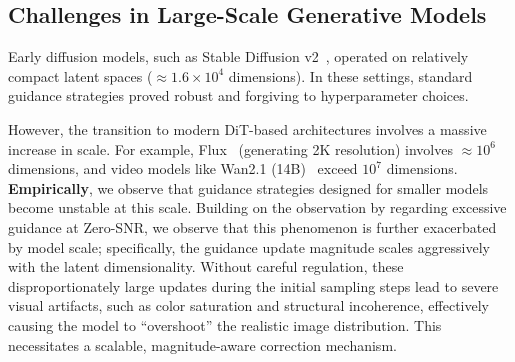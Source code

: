\subsection{Challenges in Large-Scale Generative Models}

Early diffusion models, such as Stable Diffusion v2~\citep{rombach2022high}, operated on relatively compact latent spaces ($\approx 1.6 \times 10^4$ dimensions). In these settings, standard guidance strategies proved robust and forgiving to hyperparameter choices.

However, the transition to modern DiT-based architectures involves a massive increase in scale. For example, Flux~\citep{flux-2-2025} (generating 2K resolution) involves $\approx 10^6$ dimensions, and video models like Wan2.1 (14B)~\citep{wan2.1} exceed $10^7$ dimensions. \textbf{Empirically}, we observe that guidance strategies designed for smaller models become unstable at this scale. 
Building on the observation by \citet{lin2024common} regarding excessive guidance at Zero-SNR, we observe that this phenomenon is further exacerbated by model scale; specifically, the guidance update magnitude scales aggressively with the latent dimensionality.
Without careful regulation, these disproportionately large updates during the initial sampling steps lead to severe visual artifacts, such as color saturation and structural incoherence, effectively causing the model to ``overshoot'' the realistic image distribution. This necessitates a scalable, magnitude-aware correction mechanism.

